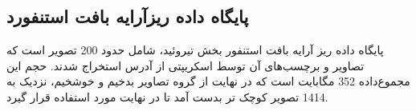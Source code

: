 \subsection{پایگاه داده ریزآرایه بافت استنفورد}\label{subsec:پایگاه-داده-ریزآرایه-بافت-استنفورد}
پایگاه داده ریز آرایه بافت استنفور\cite{marinelli2007stanford} بخش تیروئید، شامل حدود 200 تصویر است که تصاویر و برچسب‌های آن توسط اسکریپتی از آدرس \cite{stanfortissuemicroarray} استخراج شدند. حجم این مجموع‌داده 352 مگابایت است که در نهایت از گروه تصاویر بدخیم و خوشخیم، نزدیک به 1414 تصویر کوچک تر بدست آمد تا در نهایت مورد استفاده قرار گیرد.

